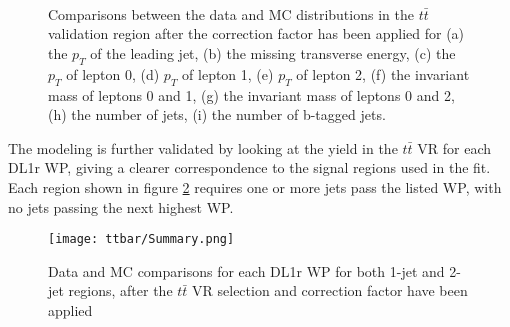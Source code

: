 \begin{figure}[H] 
    \centering
    \\                                     
    \\                                        
    \\                             
    \caption{Comparisons between the data and MC distributions in the $t\bar{t}$ validation region after the correction factor has been applied for (a) the $p_T$ of the leading jet, (b) the missing transverse energy, (c) the $p_T$ of lepton 0, (d) $p_T$ of lepton 1, (e) $p_T$ of lepton 2, (f) the invariant mass of leptons 0 and 1, (g) the invariant mass of leptons 0 and 2, (h) the number of jets, (i) the number of b-tagged jets.}                                                                   
     \label{fig:ttbar_withScale}
\end{figure}

The modeling is further validated by looking at the yield in the $t\bar{t}$ VR for each DL1r WP, giving a clearer correspondence to the signal regions used in the fit. Each region shown in figure \ref{fig:ttbar_summary} requires one or more jets pass the listed WP, with no jets passing the next highest WP.

\begin{figure}[H] 
   \centering
   \texttt{[image: ttbar/Summary.png]}   
   \caption{Data and MC comparisons for each DL1r WP for both 1-jet and 2-jet regions, after the $t\bar{t}$ VR selection and correction factor have been applied}
   \label{fig:ttbar_summary}
\end{figure}

